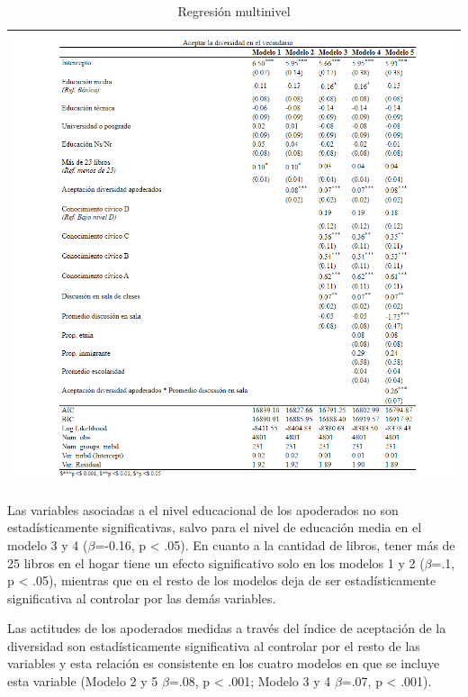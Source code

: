\documentclass[12pt,twoside]{templates/facsothesis}
\begin{document}
\begin{longtable}[]{@{}l@{}}
\caption{\label{tab:multinivel}Regresión multinivel}\tabularnewline
\toprule()
\endhead
\includegraphics{IPO/output/tables/reg.png} \\
\bottomrule()
\end{longtable}

Las variables asociadas a el nivel educacional de los apoderados no son estadísticamente significativas, salvo para el nivel de educación media en el modelo 3 y 4 (\(\beta\)=-0.16, p \textless{} .05). En cuanto a la cantidad de libros, tener más de 25 libros en el hogar tiene un efecto significativo solo en los modelos 1 y 2 (\(\beta\)=.1, p \textless{} .05), mientras que en el resto de los modelos deja de ser estadísticamente significativa al controlar por las demás variables.

Las actitudes de los apoderados medidas a través del índice de aceptación de la diversidad son estadísticamente significativa al controlar por el resto de las variables y esta relación es consistente en los cuatro modelos en que se incluye esta variable (Modelo 2 y 5 \(\beta\)=.08, p \textless{} .001; Modelo 3 y 4 \(\beta\)=.07, p \textless{} .001).
\end{document}
